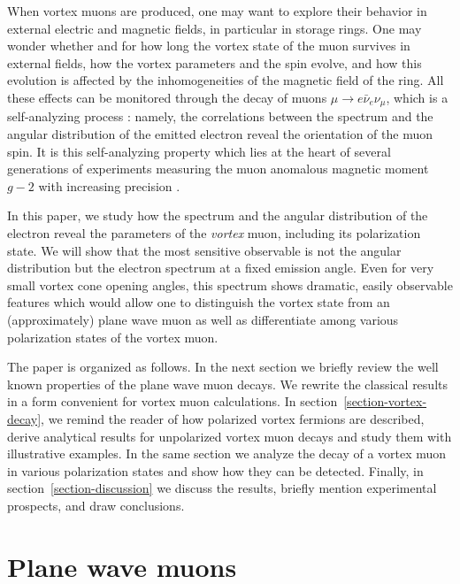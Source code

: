 \documentclass[aps,prd,longbibliography,nofootinbib,amsthm,amsmath,amssymb,amsfonts,notitlepage]{revtex4-1}
\begin{document}
When vortex muons are produced, one may want to explore their behavior in external electric and magnetic fields,
in particular in storage rings.
One may wonder whether and for how long the vortex state of the muon survives in external fields,
how the vortex parameters and the spin evolve,
and how this evolution is affected by the inhomogeneities of the magnetic field of the ring.
All these effects can be monitored through the decay of muons $\mu \to e\bar \nu_e \nu_\mu$,
which is a self-analyzing process \cite{Miller:2007kk}:
namely, the correlations between the spectrum and the angular distribution of the emitted electron reveal the orientation of the muon spin.
It is this self-analyzing property which lies at the heart of several generations of
experiments measuring the muon anomalous magnetic moment $g-2$ with increasing precision \cite{Miller:2007kk,Logashenko:2018pcl}.

In this paper, we study how the spectrum and the angular distribution of the electron
reveal the parameters of the {\em vortex} muon, including its polarization state.
We will show that the most sensitive observable is not the angular distribution but the electron spectrum at a fixed emission angle.
Even for very small vortex cone opening angles, this spectrum shows dramatic, easily observable features
which would allow one to distinguish the vortex state from an (approximately) plane wave muon
as well as differentiate among various polarization states of the vortex muon.

The paper is organized as follows. In the next section we briefly review the well known properties
of the plane wave muon decays.
We rewrite the classical results in a form convenient for vortex muon calculations.
In section~\ref{section-vortex-decay}, we remind the reader of how polarized vortex fermions are described,
derive analytical results for unpolarized vortex muon decays and study them with illustrative examples.
In the same section we analyze the decay of a vortex muon in various polarization states and show how they can be detected.
Finally, in section~\ref{section-discussion} we discuss the results, briefly mention experimental prospects,
and draw conclusions.

\section{Plane wave muons}\label{PW}
\end{document}
